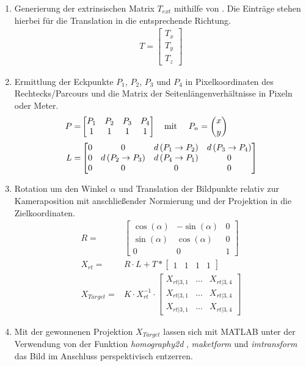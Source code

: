 \begin{enumerate}
	\item Generierung der extrinsischen Matrix $T_{ext}$ mithilfe von \citep{Calib}. Die Einträge stehen hierbei für die Translation in die entsprechende Richtung.
	\begin{align*}
	T = \begin{bmatrix}
	T_x \\ 
	T_y \\ 
	T_z 
	\end{bmatrix}
	\end{align*}  
	\item Ermittlung der Eckpunkte $P_1$, $P_2$, $P_3$ und $P_4$ in Pixelkoordinaten des Rechtecks/Parcours und die Matrix der Seitenlängenverhältnisse in Pixeln oder Meter. 
	\begin{align*}
	P =& \begin{bmatrix}
	P_1 & P_2 & P_3 & P_4 \\
	1 & 1 & 1 & 1 	  
	\end{bmatrix} \text{\quad mit \quad} P_n = \binom{ x }{ y }\\[1mm]
	L =& \begin{bmatrix}
	0 & 0 & d\left(P_1 \rightarrow P_2 \right) & d\left(P_3 \rightarrow P_4 \right)\\
	0 & d\left(P_2 \rightarrow P_3 \right) & d\left(P_4 \rightarrow P_1 \right) & 0\\
	0 & 0 & 0 & 0 
	\end{bmatrix}	
	\end{align*}
	\item Rotation um den Winkel $\alpha$ und Translation der Bildpunkte relativ zur Kameraposition mit anschließender Normierung und der Projektion in die Zielkoordinaten. 
	\begin{align*}
	R =& \begin{bmatrix}
	\cos\left(\alpha \right) & -\sin\left(\alpha \right) & 0 \\
	\sin\left(\alpha \right) & \cos\left(\alpha \right) & 0 \\
	0 & 0 & 1 	  
	\end{bmatrix} \\[1mm]
	X_{rt} =& R \cdot L + T * \begin{bmatrix}
	1 & 1 & 1 & 1
	\end{bmatrix} \\[1mm]
	X_{Target} =& K \cdot X_{rt}^{-1} \cdot \begin{bmatrix}
 	X_{rt|3,1} & ... & X_{rt|3,4} \\ 
 	X_{rt|3,1} & ... & X_{rt|3,4} \\
 	X_{rt|3,1} & ... & X_{rt|3,4}
 	\end{bmatrix}	
	\end{align*}
	\item Mit der gewonnenen Projektion $X_{Target}$ lassen sich mit MATLAB unter der Verwendung von der Funktion \textit{homography2d} \cite{Peter}, \textit{maketform} und \textit{imtransform} \cite{Steve} das Bild im Anschluss perspektivisch entzerren.	
\end{enumerate}

